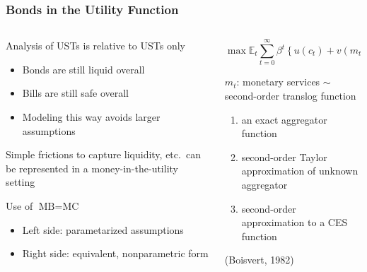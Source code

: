 \documentclass[11pt, handout, aspectratio=169]{beamer}
\newenvironment{wideitemize}{\itemize\addtolength{\itemsep}{10pt}}{\enditemize}
\begin{document}
\begin{frame}
\frametitle{Bonds in the Utility Function}
\label{slide:Utility}
\begin{columns}[t]
	\begin{column}{0.49\textwidth}
		\begin{wideitemize}
			\item Analysis of USTs is relative to USTs only
			\begin{itemize}
				\item Bonds are still liquid overall
				\item Bills are still safe overall
				\item Modeling this way avoids larger assumptions
			\end{itemize}
			\item Simple frictions to capture liquidity, etc.\ can be represented in a money-in-the-utility setting
			\item Use of $\text{MB} = \text{MC}$
			\begin{itemize}
				\item Left side: parametarized assumptions
				\item Right side: equivalent, nonparametric form
			\end{itemize}
		\end{wideitemize}
	\end{column}
	\begin{column}{0.49\textwidth}
		\begin{equation*}
			\max\mathbb{E}_t\! \sum^\infty_{t=0} \beta^t\left\{u(c_t) + v\left(m_t\right) + x(1-l_t)\right\}
			\label{eq:HH_Utility}
		\end{equation*}
		\begin{wideitemize}
			\item $m_t$: monetary services $\sim$ second-order translog function
			\begin{enumerate}
				\item an exact aggregator function
				\item second-order Taylor approximation of unknown aggregator
				\item second-order approximation to a CES function 
			\end{enumerate}
			\hfill (Boisvert, 1982)
		\end{wideitemize}
		\vfill
		\hfill \hyperlink{slide:UserCost}{}
	\end{column}
\end{columns}
\end{frame}
	
\end{document}
